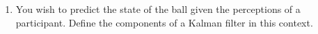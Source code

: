 \documentclass[11pt, a4paper]{article}
\begin{document}
\begin{enumerate}
    \item You wish to predict the state of the ball given the perceptions of a participant. Define the components of a Kalman filter in this context.



\end{enumerate}
\end{document}
